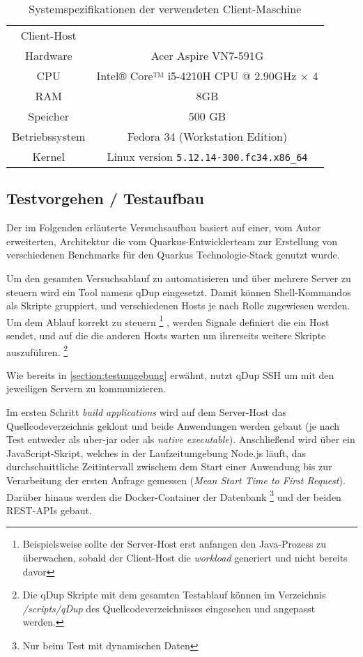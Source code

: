 \begin{table}[ht!]
    \centering
    \begin{tabular}{| c | c |}
        \hline
        Client-Host\\
        Hardware & Acer Aspire VN7-591G \\
        \hline
        CPU      & Intel® Core™ i5-4210H CPU @ 2.90GHz × 4  \\
        \hline
        RAM      & 8GB \\
        \hline
        Speicher & 500 GB   \\
        \hline
        Betriebssystem  & Fedora 34 (Workstation Edition)   \\
        \hline
        Kernel & Linux version \verb|5.12.14-300.fc34.x86_64| \\
        \hline
    \end{tabular}
    \caption{Systemspezifikationen der verwendeten Client-Maschine}
    \label{table:system_client}
\end{table}

\subsection{Testvorgehen / Testaufbau}
\label{section:vorgehen}
Der im Folgenden erläuterte Versuchsaufbau basiert auf einer, vom Autor erweiterten, Architektur die vom Quarkus-Entwicklerteam 
  zur Erstellung von verschiedenen Benchmarks für den Quarkus Technologie-Stack genutzt wurde. 
  \cite{QuarkusBlog, QuarkusJohnaohara}

  Um den gesamten Versuchsablauf zu automatisieren und über mehrere Server zu steuern wird ein Tool namens qDup eingesetzt.
  Damit können Shell-Kommandos als Skripte gruppiert, und verschiedenen Hosts je nach Rolle zugewiesen werden.
  Um dem Ablauf korrekt zu steuern
  \footnote{Beispielsweise sollte der Server-Host erst anfangen den Java-Prozess zu überwachen, sobald der Client-Host die \textit{workload}
  generiert und nicht bereits davor}
  , werden Signale definiert die ein Host sendet, und auf die die anderen Hosts warten um ihrerseits
  weitere Skripte auszuführen.
  \footnote{Die qDup Skripte mit dem gesamten Testablauf können im Verzeichnis \textit{/scripts/qDup} des Quellcodeverzeichnisses eingesehen und
angepasst werden.}

  Wie bereits in \ref{section:testumgebung} erwähnt, nutzt qDup SSH um mit den jeweiligen Servern zu kommunizieren.

  Im ersten Schritt \textit{build applications} wird auf dem Server-Host das Quellcodeverzeichnis geklont und beide Anwendungen werden gebaut
   (je nach Test entweder als uber-jar oder als \textit{native executable}). Anschließend wird über ein JavaScript-Skript,
    welches in der Laufzeitumgebung Node.js läuft, das durchschnittliche Zeitintervall zwischem dem Start einer Anwendung bis 
    zur Verarbeitung der ersten Anfrage gemessen
   (\textit{Mean Start Time to First Request}). Darüber hinaus werden die Docker-Container der Datenbank
   \footnote{Nur beim Test mit dynamischen Daten} und der beiden REST-APIs gebaut.
   
